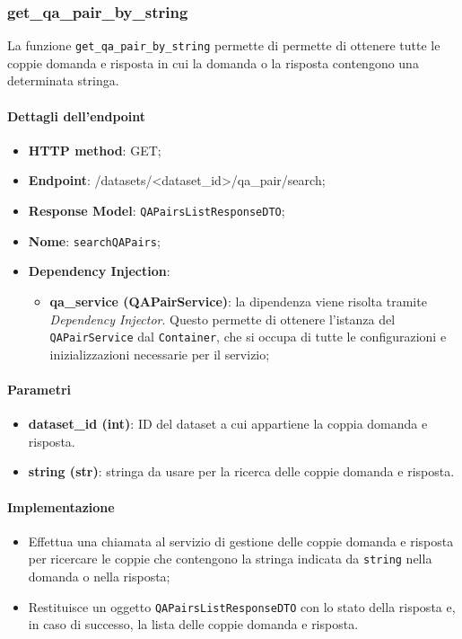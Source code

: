 \subsubsection{get\_qa\_pair\_by\_string}
La funzione \texttt{get\_qa\_pair\_by\_string} permette di permette di ottenere tutte le coppie domanda e risposta in cui la domanda o la risposta contengono una determinata stringa.
\paragraph{Dettagli dell'endpoint}
\begin{itemize}
    \item \textbf{HTTP method}: GET;
    \item \textbf{Endpoint}: /datasets/\textless dataset\_id\textgreater/qa\_pair/search;
    \item \textbf{Response Model}: \texttt{QAPairsListResponseDTO};
    \item \textbf{Nome}: \texttt{searchQAPairs};
    \item \textbf{Dependency Injection}: 
    \begin{itemize}
        \item \textbf{qa\_service (QAPairService)}: la dipendenza viene risolta tramite \textit{Dependency Injector}. Questo permette di ottenere l'istanza del \texttt{QAPairService} dal \texttt{Container}, che si occupa di tutte le configurazioni e inizializzazioni necessarie per il servizio;
    \end{itemize}
\end{itemize}
\paragraph{Parametri}
    \begin{itemize}
        \item \textbf{dataset\_id (int)}: ID del dataset a cui appartiene la coppia domanda e risposta.
        \item \textbf{string (str)}: stringa da usare per la ricerca delle coppie domanda e risposta.
    \end{itemize}

\paragraph{Implementazione}
\begin{itemize}
    \item Effettua una chiamata al servizio di gestione delle coppie domanda e risposta per ricercare le coppie che contengono la stringa indicata da \texttt{string} nella domanda o nella risposta;
    \item Restituisce un oggetto \texttt{QAPairsListResponseDTO} con lo stato della risposta e, in caso di successo, la lista delle coppie domanda e risposta.
\end{itemize}

